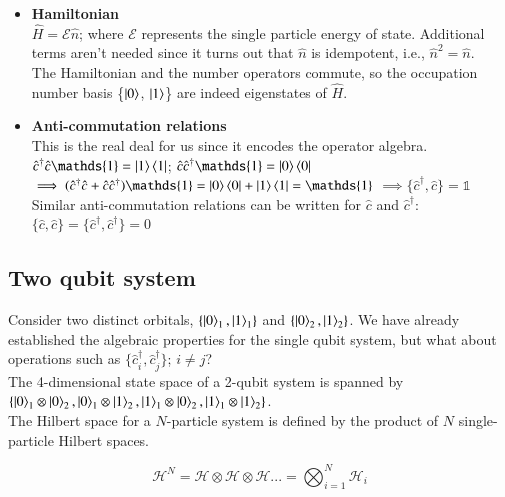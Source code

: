 \documentclass{resonance}
\begin{document}
\begin{itemize}
    \item \textbf{Hamiltonian}\\
    $\hat{H} = \mathcal{E} \hat{n}$; where $\mathcal{E}$ represents the single particle energy of state. Additional terms aren't needed since it turns out that $\hat{n}$ is idempotent, i.e., $\hat{n}^{2} = \hat{n}$. \\
    The Hamiltonian and the number operators commute, so the occupation number basis \{$\ket{0}$, $\ket{1}$\} are indeed eigenstates of $\hat{H}$.
    
    \item \textbf{Anti-commutation relations}\\
    This is the real deal for us since it encodes the operator algebra.\\
    $\hat{c}^{\dagger} \hat{c} \mathds{1} = \ket{1}\bra{1}$; $\hat{c} \hat{c}^{\dagger} \mathds{1} = \ket{0}\bra{0}$\\
    $\implies (\hat{c}^{\dagger} \hat{c} + \hat{c} \hat{c}^{\dagger}) \mathds{1} = \ket{0}\bra{0} + \ket{1}\bra{1} = \mathds{1}$ $\implies \{\hat{c}^{\dagger}, \hat{c}\} = \mathds{1}$ \\
    Similar anti-commutation relations can be written for $\hat{c}$ and $\hat{c}^{\dagger}$: $\{\hat{c}, \hat{c}\} = \{\hat{c}^{\dagger}, \hat{c}^{\dagger}\} = 0$  
\end{itemize}

\subsection{Two qubit system}
Consider two distinct orbitals, $\{\ket{0}_{1}, \ket{1}_{1}\}$ and $\{\ket{0}_{2}, \ket{1}_{2}\}$. We have already established the algebraic properties for the single qubit system, but what about operations such as $\{\hat{c}_{i}^{\dagger}, \hat{c}_{j}^{\dagger}\}$; $i \neq j$?\\
The 4-dimensional state space of a 2-qubit system is spanned by $\{\ket{0}_{1} \otimes \ket{0}_{2}, \ket{0}_{1} \otimes \ket{1}_{2}, \ket{1}_{1} \otimes \ket{0}_{2}, \ket{1}_{1} \otimes \ket{1}_{2}\}$. \\
The Hilbert space for a $N$-particle system is defined by the product of $N$ single-particle Hilbert spaces. 

\begin{equation*}
    \mathcal{H}^{N} = \mathcal{H \otimes H \otimes H ...} = \bigotimes_{i = 1}^{N} \mathcal{H}_{i}
\end{equation*}
\end{document}
